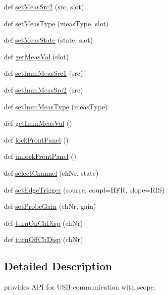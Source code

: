 \begin{DoxyCompactItemize}
\item 
def \hyperlink{namespacescope__driver_a9557d4a2261f49f29f07641edb45ef44}{set\+Meas\+Src2} (src, slot)
\item 
def \hyperlink{namespacescope__driver_afc9829fe08a35516938ebfff24f1d5f6}{set\+Meas\+Type} (meas\+Type, slot)
\item 
def \hyperlink{namespacescope__driver_a9fbe51f28cec4dc18f063dc1a3bd6fad}{set\+Meas\+State} (state, slot)
\item 
def \hyperlink{namespacescope__driver_a81c43fce6dc0c7f7c942d8173181797a}{get\+Meas\+Val} (slot)
\item 
def \hyperlink{namespacescope__driver_ae2893de33abe9e87c6dcd578ce086ab3}{set\+Imm\+Meas\+Src1} (src)
\item 
def \hyperlink{namespacescope__driver_a0a2ecb52f63eb59614b12be61ff7b664}{set\+Imm\+Meas\+Src2} (src)
\item 
def \hyperlink{namespacescope__driver_ae38317e7891b58c37b45b1fd30840a50}{set\+Imm\+Meas\+Type} (meas\+Type)
\item 
def \hyperlink{namespacescope__driver_a3e836e0e5650976223df934af2662899}{get\+Imm\+Meas\+Val} ()
\item 
def \hyperlink{namespacescope__driver_af3354c905fc3521f2346d95214163f8c}{lock\+Front\+Panel} ()
\item 
def \hyperlink{namespacescope__driver_ab4b00f96eda8159476a551ec43ff95df}{unlock\+Front\+Panel} ()
\item 
def \hyperlink{namespacescope__driver_a2799aba24b2205b99289f820ef95f42e}{select\+Channel} (ch\+Nr, state)
\item 
def \hyperlink{namespacescope__driver_a59b84d3870dd3beb19f089d52755b041}{set\+Edge\+Trigger} (source, coupl=\textquotesingle{}H\+FR\textquotesingle{}, slope=\textquotesingle{}R\+IS\textquotesingle{})
\item 
def \hyperlink{namespacescope__driver_a712e9258ee9749ff8974dcd7792b9a1e}{set\+Probe\+Gain} (ch\+Nr, gain)
\item 
def \hyperlink{namespacescope__driver_a2c16a205b8401242d27d1a6862fc12b5}{turn\+On\+Ch\+Disp} (ch\+Nr)
\item 
def \hyperlink{namespacescope__driver_a22cace12fd50d4a60c6e653cd777c55c}{turn\+Off\+Ch\+Disp} (ch\+Nr)
\end{DoxyCompactItemize}


\subsection{Detailed Description}
\begin{DoxyVerb}provides API for USB communication with scope.
\end{DoxyVerb}
 

